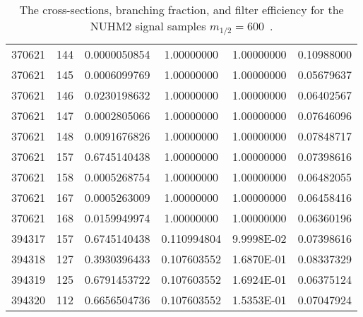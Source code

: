 \begin{table}[htp]
{{\begin{tabular}{cccccc}
370621 & 144 & 0.0000050854 & 1.00000000 & 1.00000000 & 0.10988000\\
370621 & 145 & 0.0006099769 & 1.00000000 & 1.00000000 & 0.05679637\\
370621 & 146 & 0.0230198632 & 1.00000000 & 1.00000000 & 0.06402567\\
370621 & 147 & 0.0002805066 & 1.00000000 & 1.00000000 & 0.07646096\\
370621 & 148 & 0.0091676826 & 1.00000000 & 1.00000000 & 0.07848717\\
370621 & 157 & 0.6745140438 & 1.00000000 & 1.00000000 & 0.07398616\\
370621 & 158 & 0.0005268754 & 1.00000000 & 1.00000000 & 0.06482055\\
370621 & 167 & 0.0005263009 & 1.00000000 & 1.00000000 & 0.06458416\\
370621 & 168 & 0.0159949974 & 1.00000000 & 1.00000000 & 0.06360196\\
394317 & 157 & 0.6745140438 & 0.110994804 & 9.9998E-02 & 0.07398616\\
394318 & 127 & 0.3930396433 & 0.107603552 & 1.6870E-01 & 0.08337329\\
394319 & 125 & 0.6791453722 & 0.107603552 & 1.6924E-01 & 0.06375124\\
394320 & 112 & 0.6656504736 & 0.107603552 & 1.5353E-01 & 0.07047924\\
\hline
\hline
\end{tabular}
}
}
\caption{The cross-sections, branching fraction, and filter efficiency for the NUHM2 signal samples $m_{1/2} = 600$~{\GeV}.}
\label{tab:app_xsec_m12_600}
\end{table}%

